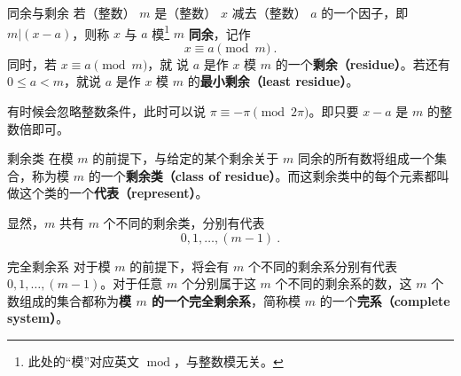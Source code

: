 

\begin{definition}{同余与剩余}
若（整数） $m$ 是（整数） $x$ 减去（整数） $a$ 的一个因子，即 $m | (x-a)$，则称 $x$ 与 $a$ 模\footnote{此处的“模”对应英文 $\operatorname{mod}$，与整数模无关。} $m$ \textbf{同余}，记作
\begin{equation}
x \equiv a \pmod m ~.
\end{equation}
同时，若 $x \equiv a \pmod m$，就 说 $a$ 是作 $x$ 模 $m$ 的一个\textbf{剩余（residue）}。若还有 $0 \le a < m$，就说 $a$ 是作 $x$ 模 $m$ 的\textbf{最小剩余（least residue）}。
\end{definition}
有时候会忽略整数条件，此时可以说 $\pi \equiv -\pi \pmod{2\pi}$。即只要 $x-a$ 是 $m$ 的整数倍即可。

\begin{definition}{剩余类}
在模 $m$ 的前提下，与给定的某个剩余关于 $m$ 同余的所有数将组成一个集合，称为模 $m$ 的一个\textbf{剩余类（class of residue）}。而这剩余类中的每个元素都叫做这个类的一个\textbf{代表（represent）}。
\end{definition}

\begin{corollary}{}
显然，$m$ 共有 $m$ 个不同的剩余类，分别有代表
\begin{equation}
0, 1, \dots, (m-1) ~.
\end{equation}
\end{corollary}
\begin{definition}{完全剩余系}
对于模 $m$ 的前提下，将会有 $m$ 个不同的剩余系分别有代表 $0, 1, \dots, (m-1)$。对于任意 $m$ 个分别属于这 $m$ 个不同的剩余系的数，这 $m$ 个数组成的集合都称为\textbf{模 $m$ 的一个完全剩余系}，简称模 $m$ 的一个\textbf{完系（complete system）}。
\end{definition}

